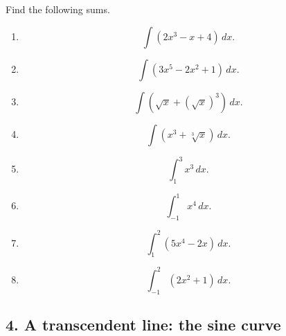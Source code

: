 \documentclass[twoside,openright]{article}
\begin{document}
\label{pset5} Find the following sums.

\begin{enumerate}

\item $$\int\!(2x^3 - x + 4)\,dx.$$

\item $$\int\!(3x^5 -2x^2 + 1) \,dx.$$

\item $$\int\!(\sqrt{x} + (\sqrt{x})^3)\,dx.$$

\item $$\int\!(x^3 + \sqrt[3]{x})\,dx.$$

\item $$\int_1^3 \!x^3\,dx.$$

\item $$\int_{-1}^1 x^4\,dx.$$

\item $$\int_{1}^2\!(5x^4 - 2x)\,dx.$$

\item $$\int_{-1}^2\!(2x^2 +1)\,dx.$$




\end{enumerate}







\subsection*{4. A transcendent line: the sine curve}
\end{document}
